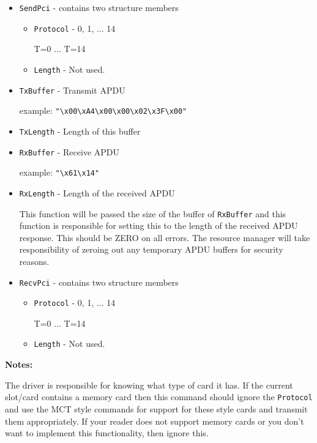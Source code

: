 \documentclass[a4paper,12pt]{article}
\newcommand{\tab}{}
\begin{document}
\begin{itemize}
\item \texttt{SendPci} - contains two structure members

\begin{itemize}
\item \texttt{Protocol} - 0, 1, ... 14

T=0 ... T=14

\item \texttt{Length} \tab - Not used.
\end{itemize}

\item \texttt{TxBuffer} \tab - Transmit APDU

example: \verb+"\x00\xA4\x00\x00\x02\x3F\x00"+

\item \texttt{TxLength} \tab - Length of this buffer
\item \texttt{RxBuffer} \tab - Receive APDU

example: \verb+"\x61\x14"+

\item \texttt{RxLength} \tab - Length of the received APDU

This function will be passed the size of the buffer of \texttt{RxBuffer}
and this function is responsible for setting this to the length of the
received APDU response. This should be ZERO on all errors. The resource
manager will take responsibility of zeroing out any temporary APDU
buffers for security reasons.

\item \texttt{RecvPci} - contains two structure members

\begin{itemize}
\item \texttt{Protocol} - 0, 1, ... 14

T=0 ... T=14

\item \texttt{Length} - Not used.
\end{itemize}
\end{itemize}

\textbf{Notes:}

The driver is responsible for knowing what type of card it has.  If the
current slot/card contains a memory card then this command should ignore
the \texttt{Protocol} and use the MCT style commands for support for
these style cards and transmit them appropriately. If your reader does
not support memory cards or you don't want to implement this
functionality, then ignore this.
\end{document}
